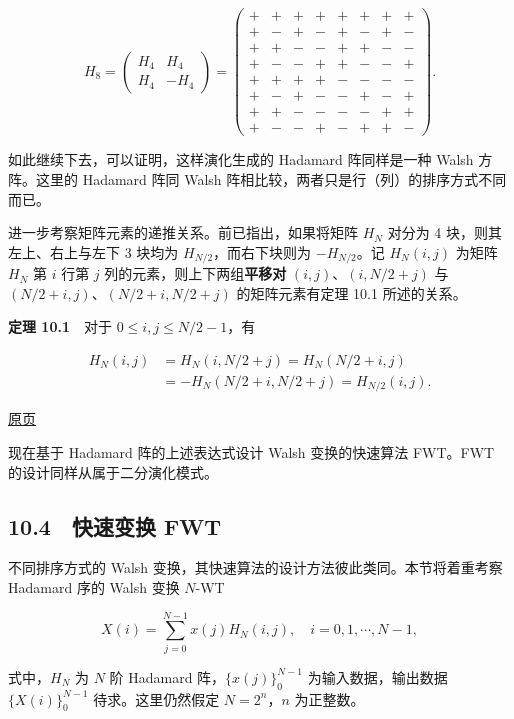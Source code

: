 \documentclass[
  10pt,
  fontset=fandol]{ctexart}
\begin{document}
\[
H_8=\begin{pmatrix}H_4&H_4\\H_4&-H_4\end{pmatrix}=\begin{pmatrix}
+&+&+&+&+&+&+&+\\
+&-&+&-&+&-&+&-\\
+&+&-&-&+&+&-&-\\
+&-&-&+&+&-&-&+\\
+&+&+&+&-&-&-&-\\
+&-&+&-&-&+&-&+\\
+&+&-&-&-&-&+&+\\
+&-&-&+&-&+&+&-
\end{pmatrix}.
\]

如此继续下去，可以证明，这样演化生成的 Hadamard 阵同样是一种 Walsh 方阵。这里的 Hadamard 阵同 Walsh 阵相比较，两者只是行（列）的排序方式不同而已。

进一步考察矩阵元素的递推关系。前已指出，如果将矩阵 \(H_N\) 对分为 4 块，则其左上、右上与左下 3 块均为 \(H_{N/2}\)，而右下块则为 \(-H_{N/2}\)。记 \(H_N(i,j)\) 为矩阵 \(H_N\) 第 \(i\) 行第 \(j\) 列的元素，则上下两组\textbf{平移对} \((i,j)\)、\((i,N/2+j)\) 与 \((N/2+i,j)\)、\((N/2+i,N/2+j)\) 的矩阵元素有定理 10.1 所述的关系。

\textbf{定理 10.1}　对于 \(0\leqslant i,j\leqslant N/2-1\)，有

\[
\begin{aligned}
H_N(i,j)&=H_N(i,N/2+j)=H_N(N/2+i,j)\\
&=-H_N(N/2+i,N/2+j)=H_{N/2}(i,j).
\end{aligned}
\]

\href{../../source-images/pdf-270.jpeg}{原页}

现在基于 Hadamard 阵的上述表达式设计 Walsh 变换的快速算法 FWT。FWT 的设计同样从属于二分演化模式。

\subsection{10.4　快速变换 FWT}\label{ux5febux901fux53d8ux6362-fwt}

不同排序方式的 Walsh 变换，其快速算法的设计方法彼此类同。本节将着重考察 Hadamard 序的 Walsh 变换 \(N\)-WT

\[
X(i)=\sum_{j=0}^{N-1}x(j)H_N(i,j),\quad i=0,1,\cdots,N-1,
\tag{10.4.1}
\]

式中，\(H_N\) 为 \(N\) 阶 Hadamard 阵，\(\{x(j)\}_0^{N-1}\) 为输入数据，输出数据 \(\{X(i)\}_0^{N-1}\) 待求。这里仍然假定 \(N=2^n\)，\(n\) 为正整数。
\end{document}

